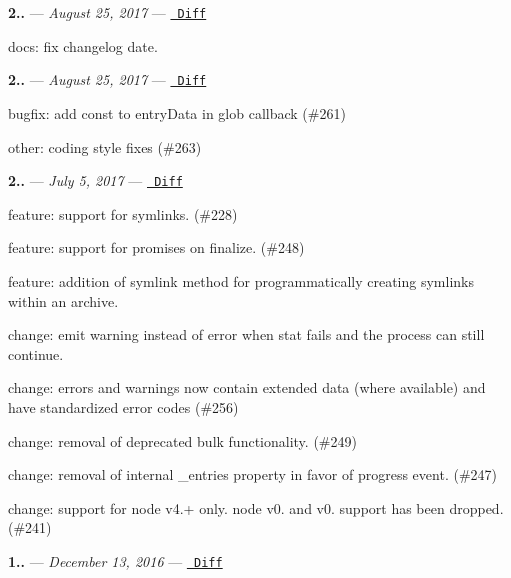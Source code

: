 {\bfseries{2..}} — 
\footnotesize {\itshape August 25, 2017}
\normalsize  — \href{https://github.com/archiverjs/node-archiver/compare/2.0.1...2.0.2}{\texttt{ Diff}}


\begin{DoxyItemize}
\item docs\+: fix changelog date.
\end{DoxyItemize}

{\bfseries{2..}} — 
\footnotesize {\itshape August 25, 2017}
\normalsize  — \href{https://github.com/archiverjs/node-archiver/compare/2.0.0...2.0.1}{\texttt{ Diff}}


\begin{DoxyItemize}
\item bugfix\+: add const to entry\+Data in glob callback (\#261)
\item other\+: coding style fixes (\#263)
\end{DoxyItemize}

{\bfseries{2..}} — 
\footnotesize {\itshape July 5, 2017}
\normalsize  — \href{https://github.com/archiverjs/node-archiver/compare/1.3.0...2.0.0}{\texttt{ Diff}}


\begin{DoxyItemize}
\item feature\+: support for symlinks. (\#228)
\item feature\+: support for promises on {\ttfamily finalize}. (\#248)
\item feature\+: addition of {\ttfamily symlink} method for programmatically creating symlinks within an archive.
\item change\+: emit {\ttfamily warning} instead of {\ttfamily error} when stat fails and the process can still continue.
\item change\+: errors and warnings now contain extended data (where available) and have standardized error codes (\#256)
\item change\+: removal of deprecated {\ttfamily bulk} functionality. (\#249)
\item change\+: removal of internal {\ttfamily \+\_\+entries} property in favor of {\ttfamily progress} event. (\#247)
\item change\+: support for node v4.+ only. node v0. and v0. support has been dropped. (\#241)
\end{DoxyItemize}

{\bfseries{1..}} — 
\footnotesize {\itshape December 13, 2016}
\normalsize  — \href{https://github.com/archiverjs/node-archiver/compare/1.2.0...1.3.0}{\texttt{ Diff}}


